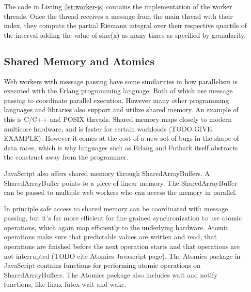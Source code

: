 \documentclass[11pt]{article}
\begin{document}
The code in Listing \ref{lst:worker-js} contains the implementation of the worker threads. Once the thread receives a message from the main thread with their index, they compute the partial Riemann integral over their respective quartile of the interval adding the value of sine(x) as many times as specified by granularity. 




\subsection{Shared Memory and Atomics}

Web workers with message passing have some similarities in how parallelism is executed with the Erlang programming language. Both of which use message passing to coordinate parallel execution. However many other programming languages and libraries also support and utilize shared memory. An example of this is C/C++ and POSIX threads. Shared memory maps closely to modern multicore hardware, and is faster for certain workloads (TODO GIVE EXAMPLE). However it comes at the cost of a new set of bugs in the shape of data races, which is why languages such as Erlang and Futhark itself abstracts the construct away from the programmer.


JavaScript also offers shared memory through SharedArrayBuffers. A SharedArrayBuffer points to a piece of linear memory. The SharedArrayBuffer can be passed to multiple web workers who can access the memory in parallel. 

In principle safe access to shared memory can be coordinated with message passing, but it's far more efficient for fine grained synchronization to use atomic operations, which again map efficiently to the underlying hardware. Atomic operations make sure that predictable values are written and read, that operations are finished before the next operation starts and that operations are not interrupted (TODO cite Atomics Javascript page). The Atomics package in JavaScript contains functions for performing atomic operations on SharedArrayBuffers. The Atomics package also includes wait and notify functions, like linux futex wait and wake.
\end{document}
